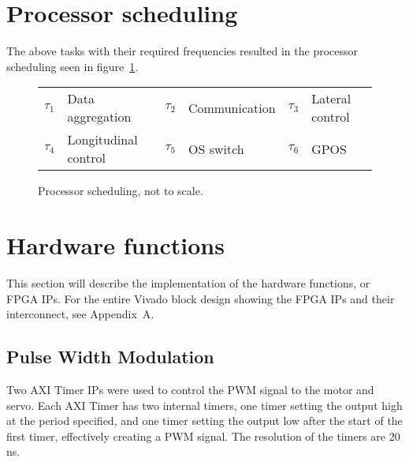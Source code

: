 \section{Processor scheduling}
The above tasks with their required frequencies resulted in the processor scheduling seen in figure~\ref{fig:rtsched}.

\begin{figure}[H]
\centering
\begin{RTGrid}[nonumbers=1]{6}{25}








\end{RTGrid}
\caption{Processor scheduling, not to scale.}\label{fig:rtsched}
\begin{tabular}{r@{: }l r@{: }l r@{: }l}
$\tau_1$ & Data aggregation & $\tau_2$ & Communication & $\tau_3$ & Lateral control\\
$\tau_4$ & Longitudinal control & $\tau_5$ & OS switch & $\tau_6$ & GPOS
\end{tabular}
\end{figure}

\section{Hardware functions}
This section will describe the implementation of the hardware functions, or FPGA IPs. For the entire Vivado block design showing the FPGA IPs and their interconnect, see Appendix~A.

\subsection{Pulse Width Modulation}
Two AXI Timer IPs were used to control the PWM signal to the motor and servo. Each AXI Timer has two internal timers, one timer setting the output high at the period specified, and one timer setting the output low after the start of the first timer, effectively creating a PWM signal. The resolution of the timers are 20 ns.

